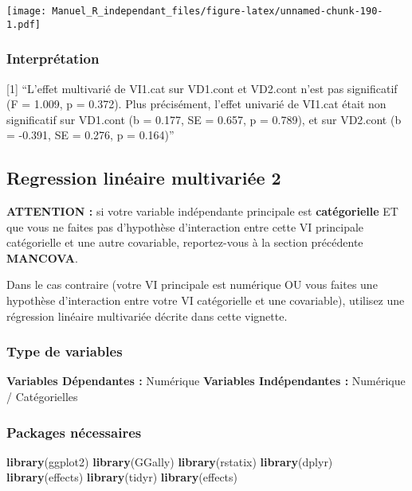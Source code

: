 \documentclass[
]{book}
\newenvironment{Shaded}{\begin{snugshade}}{\end{snugshade}}
\newcommand{\KeywordTok}[1]{\textcolor[rgb]{0.13,0.29,0.53}{\textbf{#1}}}
\newcommand{\NormalTok}[1]{#1}
\begin{document}
\texttt{[image: Manuel\_R\_independant\_files/figure-latex/unnamed-chunk-190-1.pdf]}

\hypertarget{interpruxe9tation-2}{%
\subsubsection{Interprétation}\label{interpruxe9tation-2}}

{[}1{]} ``L'effet multivarié de VI1.cat sur VD1.cont et VD2.cont n'est pas significatif (F = 1.009, p = 0.372). Plus précisément, l'effet univarié de VI1.cat était non significatif sur VD1.cont (b = 0.177, SE = 0.657, p = 0.789), et sur VD2.cont (b = -0.391, SE = 0.276, p = 0.164)''

\hypertarget{regression-linuxe9aire-multivariuxe9e-2}{%
\subsection{Regression linéaire multivariée 2}\label{regression-linuxe9aire-multivariuxe9e-2}}

\textbf{ATTENTION :} si votre variable indépendante principale est \textbf{catégorielle} ET que vous ne faites pas d'hypothèse d'interaction entre cette VI principale catégorielle et une autre covariable, reportez-vous à la section précédente \textbf{MANCOVA}.

Dans le cas contraire (votre VI principale est numérique OU vous faites une hypothèse d'interaction entre votre VI catégorielle et une covariable), utilisez une régression linéaire multivariée décrite dans cette vignette.

\hypertarget{type-de-variables-23}{%
\subsubsection{Type de variables}\label{type-de-variables-23}}

\textbf{Variables Dépendantes :} Numérique
\textbf{Variables Indépendantes :} Numérique / Catégorielles

\hypertarget{packages-nuxe9cessaires-23}{%
\subsubsection{Packages nécessaires}\label{packages-nuxe9cessaires-23}}

\begin{Shaded}
\begin{Highlighting}[]
\KeywordTok{library}\NormalTok{(ggplot2)}
\KeywordTok{library}\NormalTok{(GGally)}
\KeywordTok{library}\NormalTok{(rstatix)}
\KeywordTok{library}\NormalTok{(dplyr)}
\KeywordTok{library}\NormalTok{(effects)}
\KeywordTok{library}\NormalTok{(tidyr)}
\KeywordTok{library}\NormalTok{(effects)}
\end{Highlighting}
\end{Shaded}
\end{document}
